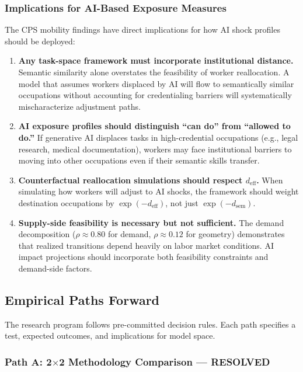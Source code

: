 \documentclass[12pt]{article}
\begin{document}
\subsubsection{Implications for AI-Based Exposure Measures}


The CPS mobility findings have direct implications for how AI shock profiles should be deployed:

\begin{enumerate}
    \item \textbf{Any task-space framework must incorporate institutional distance.} Semantic similarity alone overstates the feasibility of worker reallocation. A model that assumes workers displaced by AI will flow to semantically similar occupations without accounting for credentialing barriers will systematically mischaracterize adjustment paths.
    
    \item \textbf{AI exposure profiles should distinguish ``can do'' from ``allowed to do.''} If generative AI displaces tasks in high-credential occupations (e.g., legal research, medical documentation), workers may face institutional barriers to moving into other occupations even if their semantic skills transfer.
    
    \item \textbf{Counterfactual reallocation simulations should respect $d_{\mathrm{eff}}$.} When simulating how workers will adjust to AI shocks, the framework should weight destination occupations by $\exp(-d_{\mathrm{eff}})$, not just $\exp(-d_{\mathrm{sem}})$.
    
    \item \textbf{Supply-side feasibility is necessary but not sufficient.} The demand decomposition ($\rho \approx 0.80$ for demand, $\rho \approx 0.12$ for geometry) demonstrates that realized transitions depend heavily on labor market conditions. AI impact projections should incorporate both feasibility constraints and demand-side factors.
\end{enumerate}


\subsection{Empirical Paths Forward}
\label{subsec:paths-forward}


The research program follows pre-committed decision rules. Each path specifies a test, expected outcomes, and implications for model space.


\subsubsection{Path A: 2$\times$2 Methodology Comparison --- RESOLVED}
\end{document}
